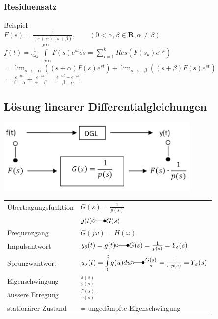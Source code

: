 		\subsubsection{Residuensatz}
			Beispiel:\\
			$F(s) = \frac{1}{(s+\alpha)(s+\beta)}, \qquad (0 < \alpha,\beta \in \mathbf{R}, \alpha \neq \beta)$\\
			$f(t) = \frac{1}{2\pi j} \int\limits_{-j\infty}^{j\infty} F(s)e^{st} ds = \sum\limits_{i=1}^k Res(F(s_k)e^{s_kt})$\\
			$=\lim_{s \to -\alpha} ((s+\alpha)F(s)e^{st}) + \lim_{s \to -\beta}((s+\beta)F(s)e^{st})$\\
			$=\frac{e^{-\alpha t}}{\beta - \alpha} + \frac{e^{-\beta t}}{\alpha - \beta} = \frac{e^{-\alpha t}-e^{-\beta t}}{\beta - \alpha}$
			
			
	\subsection{Lösung linearer Differentialgleichungen}
		\includegraphics[width=10cm]{./bilder/diffgleichungen2.png}
		
		\renewcommand{\arraystretch}{2}
		\begin{tabular}{| l | l |}
			\hline
				Übertragungsfunktion & $G(s) = \frac{1}{p(s)}$\\
				& $g(t) \laplace G(s)$ \\
			\hline
				Frequenzgang & $G(j\omega) = H(\omega)$ \\
			\hline
				Impulsantwort & $y_{\delta}(t) = g(t) \laplace G(s) = \frac{1}{p(s)}=Y_{\delta}(s)$\\
			\hline
				Sprungwantwort & $y_{\sigma}(t)=\int\limits_0^t g(u) du \laplace \frac{G(s)}{s} = \frac{1}{s \cdot p(s)} = Y_{\sigma}(s)$\\
			\hline
				Eigenschwingung & $\frac{h(s)}{p(s)}$ \\
			\hline
				äussere Erregung & $\frac{F(s)}{p(s)}$ \\
			\hline
				stationärer Zustand & = ungedämpfte Eigenschwingung\\
			\hline
		\end{tabular}
		\renewcommand{\arraystretch}{\arraystretchOriginal}\\
		
